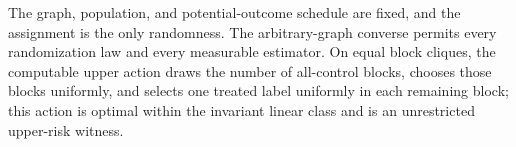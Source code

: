 The graph, population, and potential-outcome schedule are fixed, and the assignment is the only randomness.  The arbitrary-graph converse permits every randomization law and every measurable estimator.  On equal block cliques, the computable upper action draws the number of all-control blocks, chooses those blocks uniformly, and selects one treated label uniformly in each remaining block; this action is optimal within the invariant linear class and is an unrestricted upper-risk witness.